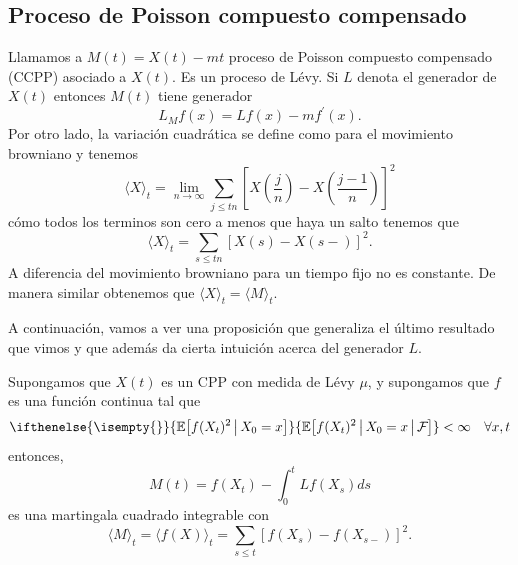 \documentclass[
marginals=nomargin
]{kaohandt}
\newcommand{\qv}[1]{\langle #1 \rangle}
\newcommand{\mean}[2][]{%
	\ifthenelse{\isempty{#1}}%
	{\mathbb{E}\!\left[#2\right]}%
	{\mathbb{E}\!\left[#2\,\middle|\,\mathcal{F}_{#1}\right]}%
}
\begin{document}
	\subsection{Proceso de Poisson compuesto compensado}
	
	Llamamos a $M(t) = X(t) - mt$ proceso de Poisson compuesto compensado (CCPP) asociado a $X(t).$ Es un proceso de Lévy. Si $L$ denota el generador de $X(t)$ entonces $M(t)$ tiene generador 
	$$L_{M}f(x) = Lf(x) - mf^{'}(x).$$
	Por otro lado, la variación cuadrática se define como para el movimiento browniano y tenemos
	$$\qv{X}_t = \lim_{n\to \infty} \sum_{j \leq tn}{[X(\frac{j}{n}) - X(\frac{j-1}{n})]}^{2}$$
	cómo todos los terminos son cero a menos que haya un salto tenemos que
	$$\qv{X}_t = \sum_{s \leq tn}{[X(s) - X(s-)]^2}.$$	
	A diferencia del movimiento browniano para un tiempo fijo no es constante. De manera similar obtenemos que $\qv{X}_t = \qv{M}_t.$
	
	A continuación, vamos a ver una proposición que generaliza el último resultado que vimos y que además da cierta intuición acerca del generador $L$.
		
	\begin{proposition}
		Supongamos que $X(t)$ es un CPP con medida de Lévy $\mu$, y supongamos que $f$ es una función continua tal que 
		$$\mean{f(X_t)^2 \, \middle | \, X_0 = x} < \infty \quad \forall x, t $$
		entonces,
		$$ M(t) = f(X_t) - \int_{0}^{t} Lf(X_s)ds$$
		es una martingala cuadrado integrable con 
		$$\qv{M}_t = \qv{f(X)}_t = \sum_{s\leq t} [f(X_s) - f(X_{s-})]^2.$$
	\end{proposition}
\end{document}
